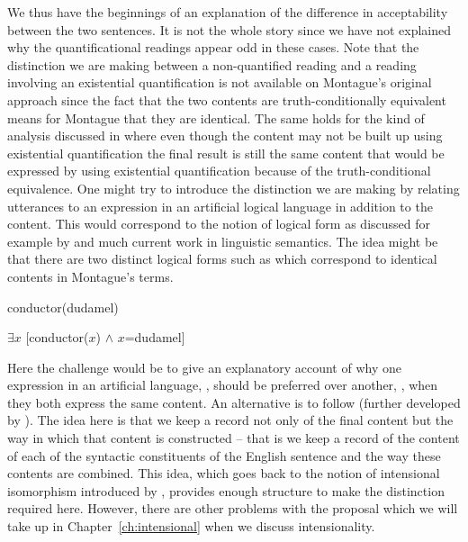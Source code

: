 We thus have the beginnings of an explanation of the difference in
acceptability between the two sentences.  It is not the whole story
since we have not explained why the quantificational readings appear
odd in these cases.  Note that the distinction we are making between a
non-quantified reading and a reading involving an existential
quantification is not available on Montague's \citeyear{Montague1973}
original approach since the fact that the two contents are
truth-conditionally equivalent means for Montague that they are
identical.  The same holds for the kind of analysis discussed in
\cite{Partee1986} where even though the content may not be built up
using existential quantification the final result is still the same
content that would be expressed by using existential quantification
because of the truth-conditional equivalence.  One might try to
introduce the distinction we are making by relating utterances to an expression
in an artificial logical language in addition to the content.  This
would correspond to the notion of logical form as discussed for
example by \cite{HeimKratzer1998} and much current work in linguistic
semantics.  The idea might be that there are two distinct logical
forms such as \nexteg{} which correspond to identical contents in
Montague's terms.
\begin{ex} 
\begin{subex} 
 
\item conductor(dudamel) 
 
\item $\exists x$ [conductor($x$) $\wedge$ $x$=dudamel] 
 
\end{subex} 
   
\end{ex} 
Here the challenge would be to give an explanatory account of why one
expression in an artificial language, , should be preferred
over another, , when they both express the same content.  An
alternative is to follow \cite{Lewis1972} (further developed by
\citealp{Cresswell1985}). The idea here is that we keep a record not
only of the final content but the way in which that content is
constructed -- that is we keep a record of the content of each of the syntactic
constituents of the English sentence and the way these contents are
combined.  This idea, which goes back to the notion of intensional
isomorphism introduced by \cite{Carnap1956}, provides enough structure
to make the distinction required here.  However, there are other
problems with the proposal which we will take up in
Chapter~\ref{ch:intensional} when we discuss intensionality. 

